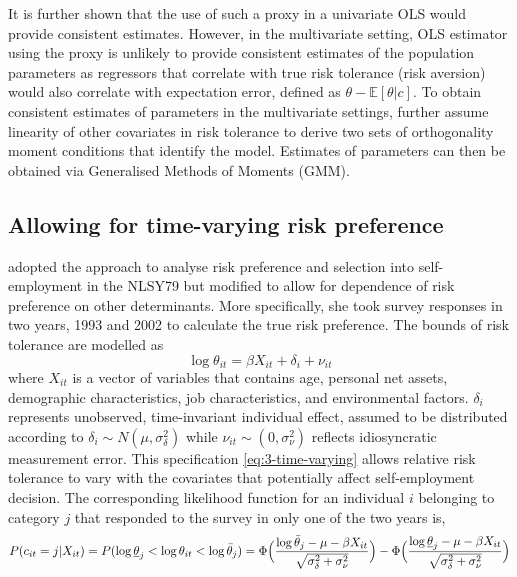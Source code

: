 \documentclass[]{article}
\begin{document}
It is further shown that the use of such a proxy in a univariate OLS would provide consistent estimates. However, in the multivariate setting, OLS estimator using the proxy is unlikely to provide consistent estimates of the population parameters as regressors that correlate with true risk tolerance (risk aversion) would also correlate with expectation error, defined as $\theta-\mathbb E[\theta|c]$. To obtain consistent estimates of parameters in the multivariate settings, \citet{kimball2008imputing} further assume linearity of other covariates in risk tolerance to derive two sets of orthogonality moment conditions that identify the model. Estimates of parameters can then be obtained via Generalised Methods of Moments (GMM).

\subsection{Allowing for time-varying risk preference}	
\citet{ahn2010attitudes} adopted the approach to analyse risk preference and selection into self-employment in the NLSY79 but modified to allow for dependence of risk preference on other determinants. More specifically, she took survey responses in two years, 1993 and 2002 to calculate the true risk preference. The bounds of risk tolerance are modelled as
 	\begin{equation}
 		\log \theta_{it}=\beta X_{it} + \delta_i+\nu_{it}
 		\label{eq:3-time-varying}
 	\end{equation}
where $X_{it}$ is a vector of variables that contains age, personal net assets, demographic characteristics, job characteristics, and environmental factors. $\delta_i$ represents unobserved, time-invariant individual effect, assumed to be distributed according to $\delta_i\sim N(\mu, \sigma^2_\delta)$ while $\nu_{it}\sim (0,\sigma^2_\nu)$ reflects idiosyncratic measurement error. This specification \eqref{eq:3-time-varying} allows relative risk tolerance to vary with the covariates that potentially affect self-employment decision. The corresponding likelihood function for an individual $i$ belonging to category $j$ that responded to the survey in only one of the two years is,
\begin{equation}
	P(c_{it}=j|X_{it})=P(\log\underline{\theta}_j<\log\theta_{it}<\log\bar\theta_j)=\Phi\Big( { \log\bar\theta_j-\mu-\beta X_{it}\over \sqrt{\sigma^2_\delta+\sigma^2_\nu} } \Big)-\Phi\Big( { \log\underline{\theta}_j-\mu-\beta X_{it}\over \sqrt{\sigma^2_\delta+\sigma^2_\nu} } \Big)
	\label{eq:4-likelihood-varying}
\end{equation} 
\end{document}
